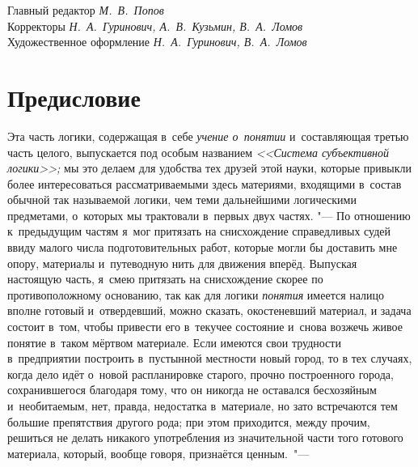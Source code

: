 Главный редактор {\em М.~В.~Попов} \\
Корректоры {\em Н.~А.~Гуринович, А.~В.~Кузьмин, В.~А.~Ломов} \\
Художественное оформление {\em Н.~А.~Гуринович, В.~А.~Ломов}

\bigskip
\clearpage

\chapter[Предисловие]{Предисловие}

Эта часть логики, содержащая в~себе {\em учение о~понятии} и~составляющая
третью часть целого, выпускается под особым названием {\em <<Система
субъективной логики>>;} мы это делаем для удобства тех друзей этой науки,
которые привыкли более интересоваться рассматриваемыми здесь материями,
входящими в~состав обычной так называемой логики, чем теми дальнейшими
логическими предметами, о~которых мы трактовали в~первых двух частях. "---
По отношению к~предыдущим частям я~мог притязать на снисхождение
справедливых судей ввиду малого числа подготовительных работ, которые могли
бы доставить мне опору, материалы и~путеводную нить для
движения вперёд. Выпуская настоящую часть, я~смею притязать на снисхождение
скорее по противоположному основанию, так как для логики {\em понятия} имеется
налицо вполне готовый и~отвердевший, можно сказать, окостеневший материал,
и задача состоит в~том, чтобы привести его в~текучее состояние и~снова
возжечь живое понятие в~таком мёртвом материале. Если имеются свои
трудности в~предприятии построить в~пустынной местности новый город, то в
тех случаях, когда дело идёт о~новой распланировке старого, прочно
построенного города, сохранившегося благодаря тому, что он никогда не
оставался бесхозяйным и~необитаемым, нет, правда, недостатка в~материале,
но зато встречаются тем большие препятствия другого рода; при этом
приходится, между прочим, решиться не делать никакого употребления из
значительной части того готового материала, который, вообще говоря,
признаётся ценным.~"---

